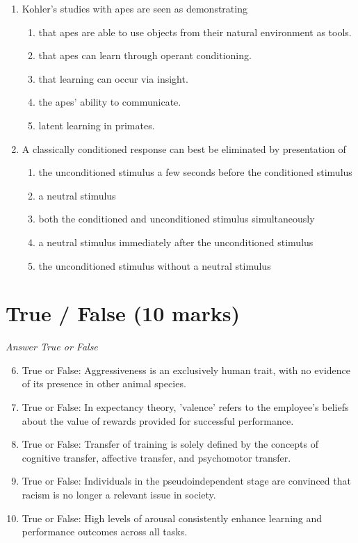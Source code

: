 \documentclass[12pt]{article}
\begin{document}
\begin{enumerate}[label=\arabic*.]
\begin{enumerate}[label=(\alph*)]
    \item the gender of the child.
\end{enumerate}
\item Kohler's studies with apes are seen as demonstrating
\begin{enumerate}[label=(\alph*)]
    \item that apes are able to use objects from their natural environment as tools.
    \item that apes can learn through operant conditioning.
    \item that learning can occur via insight.
    \item the apes' ability to communicate.
    \item latent learning in primates.
\end{enumerate}
\item A classically conditioned response can best be eliminated by presentation of
\begin{enumerate}[label=(\alph*)]
    \item the unconditioned stimulus a few seconds before the conditioned stimulus
    \item a neutral stimulus
    \item both the conditioned and unconditioned stimulus simultaneously
    \item a neutral stimulus immediately after the unconditioned stimulus
    \item the unconditioned stimulus without a neutral stimulus
\end{enumerate}
\end{enumerate}

\section*{True / False (10 marks)}
\textit{Answer True or False}
\begin{enumerate}[label=\arabic*.]
\setcounter{enumi}{5}
\item True or False: Aggressiveness is an exclusively human trait, with no evidence of its presence in other animal species.
\item True or False: In expectancy theory, 'valence' refers to the employee's beliefs about the value of rewards provided for successful performance.
\item True or False: Transfer of training is solely defined by the concepts of cognitive transfer, affective transfer, and psychomotor transfer.
\item True or False: Individuals in the pseudoindependent stage are convinced that racism is no longer a relevant issue in society.
\item True or False: High levels of arousal consistently enhance learning and performance outcomes across all tasks.
\end{enumerate}
\end{document}
